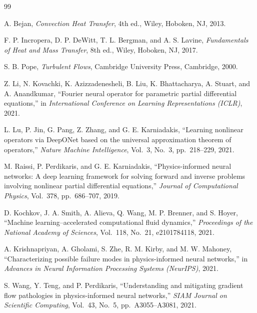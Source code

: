 \begin{thebibliography}{99}
\itemsep=0pt

A. Bejan,
\textit{Convection Heat Transfer},
4th ed., Wiley, Hoboken, NJ, 2013.

F. P. Incropera, D. P. DeWitt, T. L. Bergman, and A. S. Lavine,
\textit{Fundamentals of Heat and Mass Transfer},
8th ed., Wiley, Hoboken, NJ, 2017.

S. B. Pope,
\textit{Turbulent Flows},
Cambridge University Press, Cambridge, 2000.

Z. Li, N. Kovachki, K. Azizzadenesheli, B. Liu, K. Bhattacharya, A. Stuart, and A. Anandkumar,
``Fourier neural operator for parametric partial differential equations,''
in \textit{International Conference on Learning Representations (ICLR)}, 2021.

L. Lu, P. Jin, G. Pang, Z. Zhang, and G. E. Karniadakis,
``Learning nonlinear operators via DeepONet based on the universal approximation theorem of operators,''
\textit{Nature Machine Intelligence}, Vol.~3, No.~3, pp.~218--229, 2021.

M. Raissi, P. Perdikaris, and G. E. Karniadakis,
``Physics-informed neural networks: A deep learning framework for solving forward and inverse problems involving nonlinear partial differential equations,''
\textit{Journal of Computational Physics}, Vol.~378, pp.~686--707, 2019.

D. Kochkov, J. A. Smith, A. Alieva, Q. Wang, M. P. Brenner, and S. Hoyer,
``Machine learning--accelerated computational fluid dynamics,''
\textit{Proceedings of the National Academy of Sciences},
Vol.~118, No.~21, e2101784118, 2021.

A. Krishnapriyan, A. Gholami, S. Zhe, R. M. Kirby, and M. W. Mahoney,
``Characterizing possible failure modes in physics-informed neural networks,''
in \textit{Advances in Neural Information Processing Systems (NeurIPS)}, 2021.

S. Wang, Y. Teng, and P. Perdikaris,
``Understanding and mitigating gradient flow pathologies in physics-informed neural networks,''
\textit{SIAM Journal on Scientific Computing},
Vol.~43, No.~5, pp.~A3055--A3081, 2021.


\end{thebibliography}
